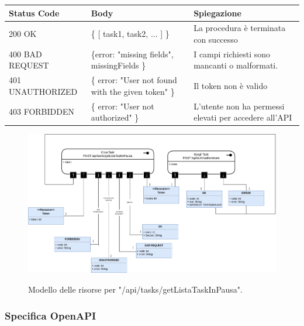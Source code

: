 \documentclass{report}
\begin{document}
\begin{center} %
	\centering
	\begin{tabular}{ |p{4cm}|p{4cm}|p{4cm}| }
		\hline
		\centering Status Code & \qquad\qquad\quad Body & \qquad\quad Spiegazione\\ %
		\hline
		200 OK & \{ [ task1, task2, ... ] \}  & La procedura è terminata con successo	\\ 
		\hline
		400 BAD REQUEST & \{error: "missing fields", missingFields \} & I campi richiesti sono mancanti o malformati. \\
		\hline
		401 UNAUTHORIZED & \{ error: "User not found with the given token" \} & Il token non è valido \\
		\hline
		403 FORBIDDEN & \{ error: "User not authorized" \} &  L'utente non ha permessi elevati per accedere all'API \\
		\hline
	\end{tabular}
\end{center}

\begin{figure}[H]
	\centering\includegraphics[width=1\textwidth]{images/model_in_pausa.png}
	
	Modello delle risorse per "/api/tasks/getListaTaskInPausa".
\end{figure}

\subsubsection*{Specifica OpenAPI}
\end{document}
